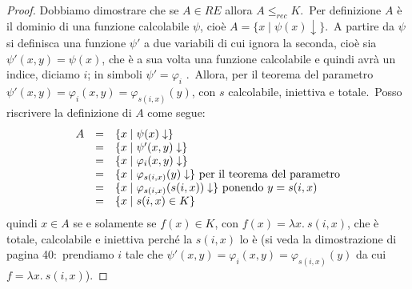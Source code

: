 \begin{proof}
    Dobbiamo dimostrare che se $A \in RE$ allora $A \leqslant_{rec} K$.\
    Per definizione $A$ è il dominio di una funzione calcolabile $\psi$, cioè $A = \{x \mid \psi(x) \downarrow \}$.\
    A partire da $\psi$ si definisca una funzione $\psi'$ a due variabili di cui ignora la seconda, cioè sia $\psi'(x, y) = \psi(x)$, che è a sua volta una funzione calcolabile e quindi avrà un indice, diciamo $i$; in simboli $\psi'= \varphi_i$ .\
    Allora, per il teorema del parametro $\psi'(x, y) = \varphi_i(x, y) = \varphi_{s(i,x)}(y)$, con $s$ calcolabile, iniettiva e totale.\
    Posso riscrivere la definizione di $A$ come segue:
    \[\begin{array}{l c l}
            A & = & \{x \mid \psi(x) \downarrow\}                                                        \\
              & = & \{x \mid \psi'(x,y) \downarrow\}                                                     \\
              & = & \{x \mid \varphi_i(x,y) \downarrow\}                                                 \\
              & = & \{x \mid \varphi_{s(i,x)}(y) \downarrow\}\ \mathrm{per\ il\ teorema\ del\ parametro} \\
              & = & \{x \mid \varphi_{s(i,x)}(s(i,x)) \downarrow\}\ \mathrm{ponendo}\ y = s(i,x)         \\
              & = & \{x \mid s(i,x) \in K\}                                                              \\
        \end{array}\]
    quindi $x \in A$ se e solamente se $f(x) \in K$, con $f(x) = \lambda x.\ s(i,x)$, che è totale, calcolabile e iniettiva perché la $s(i,x)$ lo è (si veda la dimostrazione di pagina 40:\ prendiamo $i$ tale che $\psi'(x,y) = \varphi_i(x,y) = \varphi_{s(i,x)}(y)$ da cui $f = \lambda x.\ s(i,x)$).
\end{proof}

\newpage

